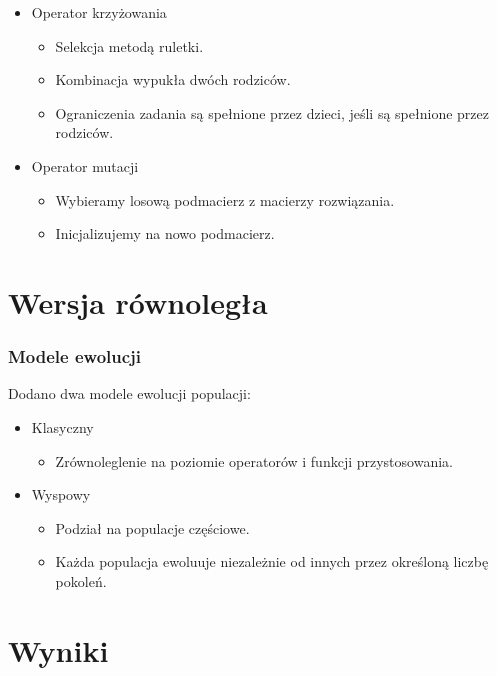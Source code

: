 \documentclass{beamer}
\begin{document}
\begin{frame}
 {
    \begin{itemize}
        \item Operator krzyżowania
            \begin{itemize}
                \item Selekcja metodą ruletki.
                \item Kombinacja wypukła dwóch rodziców.
                \item Ograniczenia zadania są spełnione przez dzieci, jeśli są spełnione przez rodziców.
            \end{itemize}
        \item Operator mutacji
            \begin{itemize}
                \item Wybieramy losową podmacierz z macierzy rozwiązania.
                \item Inicjalizujemy na nowo podmacierz. 
            \end{itemize}
    \end{itemize}
}
    
\end{frame}

\section{Wersja równoległa}

\begin{frame}
    \frametitle{Modele ewolucji}
    Dodano dwa modele ewolucji populacji:
    \begin{itemize}
        \item Klasyczny
        \begin{itemize}
            \item Zrównoleglenie na poziomie operatorów i funkcji przystosowania.
        \end{itemize}
        \item Wyspowy
        \begin{itemize}
            \item Podział na populacje częściowe.
            \item Każda populacja ewoluuje niezależnie od innych przez określoną liczbę pokoleń.
        \end{itemize}
    \end{itemize}
\end{frame}


\section{Wyniki}
\end{document}

